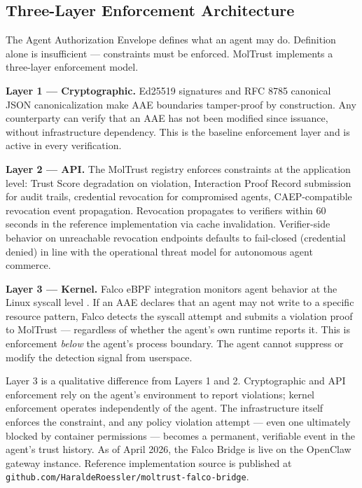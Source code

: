\subsection{Three-Layer Enforcement Architecture}

The Agent Authorization Envelope defines what an agent may do. Definition alone is insufficient — constraints must be enforced. MolTrust implements a three-layer enforcement model.


\textbf{Layer 1 — Cryptographic.} Ed25519 signatures and RFC 8785 canonical JSON canonicalization make AAE boundaries tamper-proof by construction. Any counterparty can verify that an AAE has not been modified since issuance, without infrastructure dependency. This is the baseline enforcement layer and is active in every verification.


\textbf{Layer 2 — API.} The MolTrust registry enforces constraints at the application level: Trust Score degradation on violation, Interaction Proof Record submission for audit trails, credential revocation for compromised agents, CAEP-compatible revocation event propagation. Revocation propagates to verifiers within 60 seconds in the reference implementation via cache invalidation. Verifier-side behavior on unreachable revocation endpoints defaults to fail-closed (credential denied) in line with the operational threat model for autonomous agent commerce.


\textbf{Layer 3 — Kernel.} Falco eBPF integration monitors agent behavior at the Linux syscall level \cite{ref13_falcobridge}. If an AAE declares that an agent may not write to a specific resource pattern, Falco detects the syscall attempt and submits a violation proof to MolTrust — regardless of whether the agent's own runtime reports it. This is enforcement \textit{below} the agent's process boundary. The agent cannot suppress or modify the detection signal from userspace.


Layer 3 is a qualitative difference from Layers 1 and 2. Cryptographic and API enforcement rely on the agent's environment to report violations; kernel enforcement operates independently of the agent. The infrastructure itself enforces the constraint, and any policy violation attempt — even one ultimately blocked by container permissions — becomes a permanent, verifiable event in the agent's trust history. As of April 2026, the Falco Bridge is live on the OpenClaw gateway instance. Reference implementation source is published at \texttt{github.\allowbreak com/\allowbreak HaraldeRoessler/\allowbreak moltrust-falco-bridge}.


